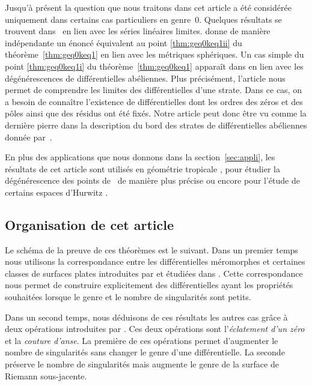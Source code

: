 Jusqu'à présent la question que nous traitons dans cet article a été considérée uniquement dans certains cas particuliers en genre~$0$. Quelques résultats se trouvent dans~\cite[\S2]{eiha} en lien avec les séries linéaires limites. \cite{Erm} donne de manière indépendante un énoncé équivalent au point \eqref{thm:geq0keq1ii} du théorème~\ref{thm:geq0keq1} en lien avec les métriques sphériques. Un cas simple du point \eqref{thm:geq0keq1i} du théorème~\ref{thm:geq0keq1} apparaît dans \cite[Lem.\,3.6]{BCGGM} en lien avec les dégénérescences de différentielles abéliennes. Plus précisément, l'article \cite{BCGGM} nous permet de comprendre les limites des différentielles d'une strate. Dans ce cas, on a besoin de connaître l'existence de différentielles dont les ordres des zéros et des pôles ainsi que des résidus ont été fixés. Notre article peut donc être vu comme la dernière pierre dans la description du bord des strates de différentielles abéliennes donnée par~\cite{BCGGM}.

En plus des applications que nous donnons dans la section~\ref{sec:appli}, les résultats de cet article sont utilisés en géométrie tropicale \cite{MUW}, pour étudier la dégénérescence des points de \Weierstrass~de manière plus précise \cite{genWei} ou encore pour l'étude de certains espaces d'Hurwitz \cite{mulSecond}.

\subsection{Organisation de cet article}

Le schéma de la preuve de ces théorèmes est le suivant. Dans un premier temps nous utilisons la correspondance entre les différentielles méromorphes et certaines classes de surfaces plates introduites par \cite{Bo} et étudiées dans \cite{tahar}. Cette correspondance nous permet de construire explicitement des différentielles ayant les propriétés souhaitées lorsque le genre et le nombre de singularités sont petits.

Dans un second temps, nous déduisons de ces résultats les autres cas grâce à deux opérations introduites par \cite{kozo}. Ces deux opérations sont l'\emph{éclatement d'un zéro} et la \emph{couture d'anse}. La première de ces opérations permet d'augmenter le nombre de singularités sans changer le genre d'une différentielle. La seconde préserve le nombre de singularités mais augmente le genre de la surface de Riemann sous-jacente.

